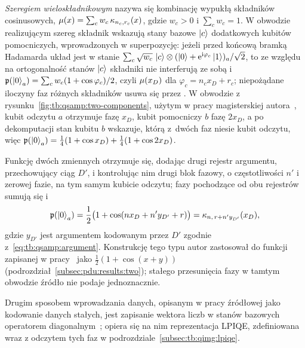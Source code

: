 \emph{Szeregiem wieloskładnikowym} nazywa się kombinację wypukłą składników cosinusowych, $\mu(x)=\sum_{c}w_c\,\kappa_{n_c,r_c}(x)$, gdzie $w_c>0$ i $\sum_{c}w_c=1$.
W obwodzie realizującym szereg składnik wskazują stany bazowe $\ket{c}$ dodatkowych kubitów pomocniczych, wprowadzonych w superpozycję: jeżeli przed końcową bramką Hadamarda układ jest w stanie $\sum_{c}\sqrt{w_c}\,\ket{c}\otimes(\ket{0}+\mathrm{e}^{\mathrm{i}\varphi_c}\ket{1})_a/\sqrt{2}$, to ze względu na ortogonalność stanów $\ket{c}$ składniki nie interferują ze sobą i $\mathfrak{p}(\ket{0}_a)=\sum_{c}w_c(1+\cos\varphi_c)/2$, czyli $\mu(x_D)$ dla $\varphi_c=n_cx_D+r_c$; niepożądane iloczyny faz różnych składników usuwa się przez .
W obwodzie z rysunku~\ref{fig:tb:qsamp:two-components}, użytym w pracy magisterskiej autora~\cite{werner_magisterka_2022}, kubit odczytu $a$ otrzymuje fazę $x_D$, kubit pomocniczy $b$ fazę $2x_D$, a po dekomputacji stan kubitu $b$ wskazuje, którą z~dwóch faz niesie kubit odczytu, więc $\mathfrak{p}(\ket{0}_a)=\tfrac{1}{4}(1+\cos x_D)+\tfrac{1}{4}(1+\cos 2x_D)$.

Funkcję dwóch zmiennych otrzymuje się, dodając drugi rejestr argumentu, przechowujący ciąg $D'$, i kontrolując nim drugi blok fazowy, o częstotliwości $n'$ i zerowej fazie, na tym samym kubicie odczytu; fazy pochodzące od obu rejestrów sumują się i
\begin{equation}\label{eq:tb:qsamp:two-variables}
\mathfrak{p}(\ket{0}_a)=\frac{1}{2}\bigl(1+\cos(nx_D+n'y_{D'}+r)\bigr)=\kappa_{n,\,r+n'y_{D'}}(x_D),
\end{equation}
gdzie $y_{D'}$ jest argumentem kodowanym przez $D'$ zgodnie z~\eqref{eq:tb:qsamp:argument}.
Konstrukcję tego typu autor zastosował do funkcji zapisanej w pracy~\cite{werner_magisterka_2022} jako $\tfrac{1}{2}(1+\cos(x+y))$ (podrozdział~\ref{subsec:pdu:results:two}); stałego przesunięcia fazy w tamtym obwodzie źródło nie podaje jednoznacznie.

Drugim sposobem wprowadzania danych, opisanym w pracy źródłowej jako kodowanie danych stałych, jest zapisanie wektora liczb w  stanów bazowych operatorem diagonalnym~\cite{wereszczynski_cosine_2020}; opiera się na nim reprezentacja LPIQE, zdefiniowana wraz z odczytem tych faz w podrozdziale~\ref{subsec:tb:qimg:lpiqe}.
